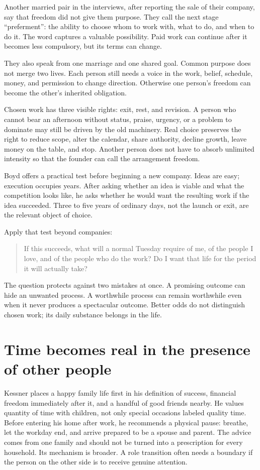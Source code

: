 Another married pair in the interviews, after reporting the sale of their
company, say that freedom did not give them purpose. They call the next stage
“preferment”: the ability to choose whom to work with, what to do, and when to
do it. The word captures a valuable possibility. Paid work can continue after
it becomes less compulsory, but its terms can change.

They also speak from one marriage and one shared goal. Common purpose does not
merge two lives. Each person still needs a voice in the work, belief, schedule,
money, and permission to change direction. Otherwise one person's freedom can
become the other's inherited obligation.

Chosen work has three visible rights: exit, rest, and revision. A person who
cannot bear an afternoon without status, praise, urgency, or a problem to
dominate may still be driven by the old machinery. Real choice preserves the
right to reduce scope, alter the calendar, share authority, decline growth,
leave money on the table, and stop. Another person does not have to absorb
unlimited intensity so that the founder can call the arrangement freedom.

Boyd offers a practical test before beginning a new company. Ideas are easy;
execution occupies years. After asking whether an idea is viable and what the
competition looks like, he asks whether he would want the resulting work if
the idea succeeded. Three to five years of ordinary days, not the launch or
exit, are the relevant object of choice.

Apply that test beyond companies:

\begin{quote}
If this succeeds, what will a normal Tuesday require of me, of the people I
love, and of the people who do the work? Do I want that life for the period it
will actually take?
\end{quote}

The question protects against two mistakes at once. A promising outcome can
hide an unwanted process. A worthwhile process can remain worthwhile even
when it never produces a spectacular outcome. Better odds do not distinguish
chosen work; its daily substance belongs in the life.

\section{Time becomes real in the presence of other people}

Kessner places a happy family life first in his definition of success,
financial freedom immediately after it, and a handful of good friends nearby.
He values quantity of time with children, not only special occasions labeled
quality time. Before entering his home after work, he recommends a physical
pause: breathe, let the workday end, and arrive prepared to be a spouse and
parent. The advice comes from one family and should not be turned into a
prescription for every household. Its mechanism is broader. A role transition
often needs a boundary if the person on the other side is to receive genuine
attention.

